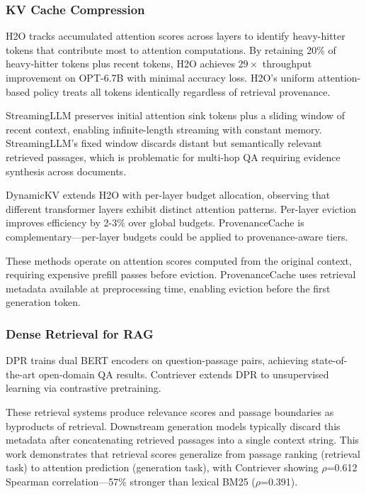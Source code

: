 
\subsubsection{KV Cache Compression}

H2O \citep{zhang2023h2o} tracks accumulated attention scores across layers to identify heavy-hitter tokens that contribute most to attention computations. By retaining 20\% of heavy-hitter tokens plus recent tokens, H2O achieves $29\times$ throughput improvement on OPT-6.7B with minimal accuracy loss. H2O's uniform attention-based policy treats all tokens identically regardless of retrieval provenance.

StreamingLLM \citep{xiao2024streamingllm} preserves initial attention sink tokens plus a sliding window of recent context, enabling infinite-length streaming with constant memory. StreamingLLM's fixed window discards distant but semantically relevant retrieved passages, which is problematic for multi-hop QA requiring evidence synthesis across documents.

DynamicKV \citep{liu2024dynamickv} extends H2O with per-layer budget allocation, observing that different transformer layers exhibit distinct attention patterns. Per-layer eviction improves efficiency by 2-3\% over global budgets. ProvenanceCache is complementary---per-layer budgets could be applied to provenance-aware tiers.

These methods operate on attention scores computed from the original context, requiring expensive prefill passes before eviction. ProvenanceCache uses retrieval metadata available at preprocessing time, enabling eviction before the first generation token.

\subsubsection{Dense Retrieval for RAG}

DPR \citep{karpukhin2020dpr} trains dual BERT encoders on question-passage pairs, achieving state-of-the-art open-domain QA results. Contriever \citep{Izacard2021} extends DPR to unsupervised learning via contrastive pretraining.

These retrieval systems produce relevance scores and passage boundaries as byproducts of retrieval. Downstream generation models typically discard this metadata after concatenating retrieved passages into a single context string. This work demonstrates that retrieval scores generalize from passage ranking (retrieval task) to attention prediction (generation task), with Contriever showing $\rho$=0.612 Spearman correlation---57\% stronger than lexical BM25 ($\rho$=0.391).

